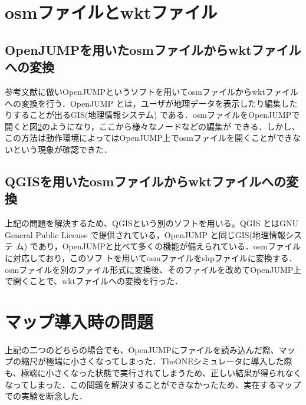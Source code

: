 \documentclass[11pt]{icsthesis}
\begin{document}
\section{osmファイルとwktファイル}

\subsection{OpenJUMPを用いたosmファイルからwktファイルへの変換}
参考文献に倣いOpenJUMPというソフトを用いてosmファイルからwktファイルへの変換を行う．OpenJUMP とは，ユーザが地理データを表示したり編集したりすることが出るGIS(地理情報システム)
である．osmファイルをOpenJUMPで開くと図\ref{}のようになり，ここから様々なノードなどの編集が
できる．しかし、この方法は動作環境によってはOpenJUMP上でosmファイルを開くことができないという現象が確認できた．
\subsection{QGISを用いたosmファイルからwktファイルへの変換}
上記の問題を解決するため、QGISという別のソフトを用いる。QGIS とはGNU General Public License で提供されている，OpenJUMP と同じGIS(地理情報システ
ム) であり，OpenJUMPと比べて多くの機能が備えられている．osmファイルに対応しており，このソフ
トを用いてosmファイルをshpファイルに変換する．osmファイルを別のファイル形式に変換後、そのファイルを改めてOpenJUMP上で開くことで、wktファイルへの変換を行った．
\section{マップ導入時の問題}
上記の二つのどちらの場合でも、OpenJUMPにファイルを読み込んだ際、マップの縮尺が極端に小さくなってしまった．TheONEシミュレータに導入した際も、極端に小さくなった状態で実行されてしまうため、正しい結果が得られなくなってしまった．この問題を解決することができなかったため、実在するマップでの実験を断念した．
\end{document}
